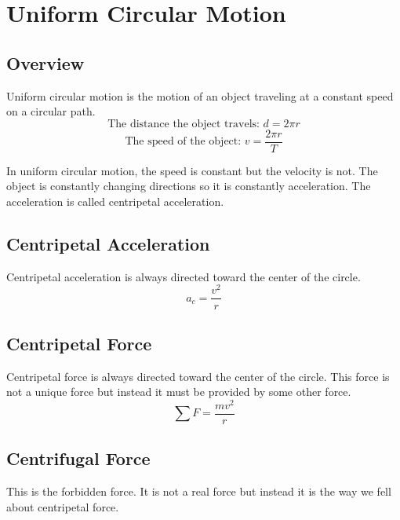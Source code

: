 \section{Uniform Circular Motion}

\subsection{Overview}
Uniform circular motion is the motion of an object traveling at a constant speed on a circular path. \[\mbox{The distance the object travels: } d=2\pi r\] \[\mbox{The speed of the object: } v=\frac{2\pi r}{T}\]

In uniform circular motion, the speed is constant but the velocity is not. The object is constantly changing directions so it is constantly acceleration. The acceleration is called centripetal acceleration. 

\subsection{Centripetal Acceleration}
Centripetal acceleration is always directed toward the center of the circle. \[a_c=\frac{v^2}{r}\]

\subsection{Centripetal Force}
Centripetal force is always directed toward the center of the circle. This force is not a unique force but instead it must be provided by some other force. \[\sum F = \frac{mv^2}{r}\]

\subsection{Centrifugal Force}
This is the forbidden force. It is not a real force but instead it is the way we fell about centripetal force.